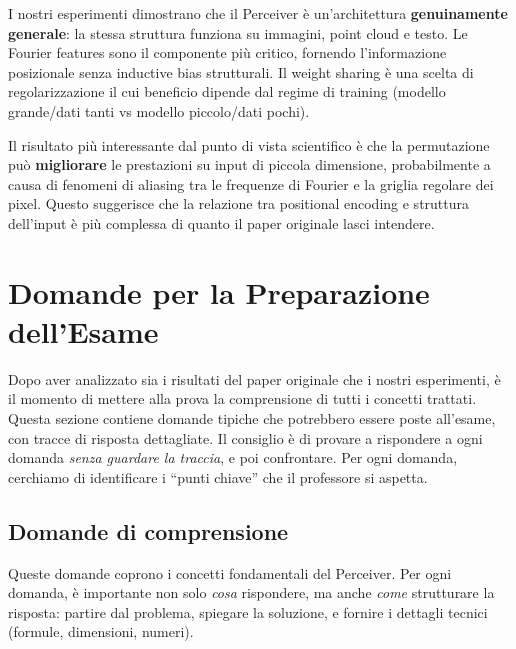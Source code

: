 \documentclass[12pt,a4paper]{article}
\begin{document}
\begin{examplebox}
I nostri esperimenti dimostrano che il Perceiver \`e un'architettura \textbf{genuinamente generale}: la stessa struttura funziona su immagini, point cloud e testo. Le Fourier features sono il componente pi\`u critico, fornendo l'informazione posizionale senza inductive bias strutturali. Il weight sharing \`e una scelta di regolarizzazione il cui beneficio dipende dal regime di training (modello grande/dati tanti vs modello piccolo/dati pochi).

Il risultato pi\`u interessante dal punto di vista scientifico \`e che la permutazione pu\`o \textbf{migliorare} le prestazioni su input di piccola dimensione, probabilmente a causa di fenomeni di aliasing tra le frequenze di Fourier e la griglia regolare dei pixel. Questo suggerisce che la relazione tra positional encoding e struttura dell'input \`e pi\`u complessa di quanto il paper originale lasci intendere.
\end{examplebox}


\newpage
\section{Domande per la Preparazione dell'Esame} \label{sec:domande}

Dopo aver analizzato sia i risultati del paper originale che i nostri esperimenti, \`e il momento di mettere alla prova la comprensione di tutti i concetti trattati. Questa sezione contiene domande tipiche che potrebbero essere poste all'esame, con tracce di risposta dettagliate. Il consiglio \`e di provare a rispondere a ogni domanda \emph{senza guardare la traccia}, e poi confrontare. Per ogni domanda, cerchiamo di identificare i ``punti chiave'' che il professore si aspetta.

\subsection{Domande di comprensione} \label{sec:domande_comp}

Queste domande coprono i concetti fondamentali del Perceiver. Per ogni domanda, \`e importante non solo \emph{cosa} rispondere, ma anche \emph{come} strutturare la risposta: partire dal problema, spiegare la soluzione, e fornire i dettagli tecnici (formule, dimensioni, numeri).
\end{document}
